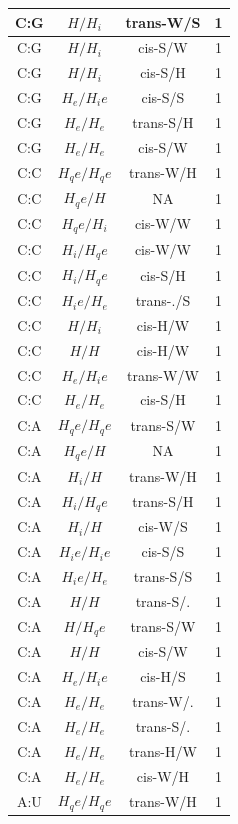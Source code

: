 \begin{center}
\begin{longtable}{c|c|c|c}
C:G & $H/H_i$ & trans-W/S & 1 \\  \hline
C:G & $H/H_i$ & cis-S/W & 1 \\  \hline
C:G & $H/H_i$ & cis-S/H & 1 \\  \hline
C:G & $H_e/H_ie$ & cis-S/S & 1 \\  \hline
C:G & $H_e/H_e$ & trans-S/H & 1 \\  \hline
C:G & $H_e/H_e$ & cis-S/W & 1 \\  \hline
C:C & $H_qe/H_qe$ & trans-W/H & 1 \\  \hline
C:C & $H_qe/H$ & NA & 1 \\  \hline
C:C & $H_qe/H_i$ & cis-W/W & 1 \\  \hline
C:C & $H_i/H_qe$ & cis-W/W & 1 \\  \hline
C:C & $H_i/H_qe$ & cis-S/H & 1 \\  \hline
C:C & $H_ie/H_e$ & trans-./S & 1 \\  \hline
C:C & $H/H_i$ & cis-H/W & 1 \\  \hline
C:C & $H/H$ & cis-H/W & 1 \\  \hline
C:C & $H_e/H_ie$ & trans-W/W & 1 \\  \hline
C:C & $H_e/H_e$ & cis-S/H & 1 \\  \hline
C:A & $H_qe/H_qe$ & trans-S/W & 1 \\  \hline
C:A & $H_qe/H$ & NA & 1 \\  \hline
C:A & $H_i/H$ & trans-W/H & 1 \\  \hline
C:A & $H_i/H_qe$ & trans-S/H & 1 \\  \hline
C:A & $H_i/H$ & cis-W/S & 1 \\  \hline
C:A & $H_ie/H_ie$ & cis-S/S & 1 \\  \hline
C:A & $H_ie/H_e$ & trans-S/S & 1 \\  \hline
C:A & $H/H$ & trans-S/. & 1 \\  \hline
C:A & $H/H_qe$ & trans-S/W & 1 \\  \hline
C:A & $H/H$ & cis-S/W & 1 \\  \hline
C:A & $H_e/H_ie$ & cis-H/S & 1 \\  \hline
C:A & $H_e/H_e$ & trans-W/. & 1 \\  \hline
C:A & $H_e/H_e$ & trans-S/. & 1 \\  \hline
C:A & $H_e/H_e$ & trans-H/W & 1 \\  \hline
C:A & $H_e/H_e$ & cis-W/H & 1 \\  \hline
A:U & $H_qe/H_qe$ & trans-W/H & 1 \\  \hline

\end{longtable}
\end{center}
